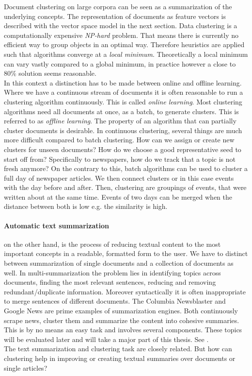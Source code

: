   Document clustering on large corpora can be seen as a summarization of the underlying concepts. The representation of documents as feature vectors is described with the vector space model in the next section. Data clustering is a computationally expensive \emph{NP-hard} problem. That means there is currently no efficient way to group objects in an optimal way. Therefore heuristics are applied such that algorithms converge at a  \emph{local minimum}. Theoretically a local minimum can vary vastly compared to a global minimum, in practice however a close to 80\% solution seems reasonable.\\ 
  In this context a distinction has to be made between online and offline learning. Where we have a continuous stream of documents it is often reasonable to run a clustering algorithm continuously. This is called \emph{online learning}. Most clustering algorithms need all documents at once, as a batch, to generate clusters. This is referred to as \emph{offline learning}. The property of an algorithm that can partially cluster documents is desirable. In continuous clustering, several things are much more difficult compared to batch clustering. How can we assign or create new clusters for unseen documents? How do we choose a good representative seed to start off from? Specifically to newspapers, how do we track that a topic is not fresh anymore? On the contrary to this, batch algorithms can be used to cluster a full day of newspaper articles. We then connect clusters or in this case events with the day before and after. Then, clustering are groupings of events, that were written about at the same time. Events of two days can be merged when the distance between both is low e.g. the similarity is high.

  \paragraph{Automatic text summarization} on the other hand, is the process of reducing textual content to the most important concepts in a readable, formatted form to the user. \cite{SumEvaluation2001} We have to distinct between summarization of single documents and a collection of documents as well. In multi-summarization the problem lies in identifying topics across documents, finding the most relevant sentences, reducing and removing redundant/duplicate information. Moreover syntactically it is often inappropriate to merge sentences of different documents. The Columbia Newsblaster and Google News are prime examples of summarization engines. Both continuously scrape news, cluster them and summarize the content into cohesive summaries. This is by no means an easy task and involves several components. These topics will be evaluated later and will take a major part of this thesis. See \cite{NewsBlaster2002, ColumbiaExperimentsSum2002}.\\
  The text summarization and clustering task are closely related. But how can clustering help in improving or creating textual summaries over documents or single articles?
  
